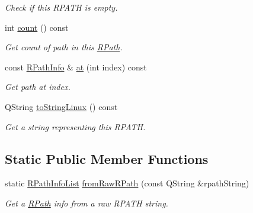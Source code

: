 \begin{DoxyCompactItemize}
\begin{DoxyCompactList}\small\item\em Check if this R\+P\+A\+TH is empty. \end{DoxyCompactList}\item 
int \hyperlink{class_mdt_1_1_deploy_utils_1_1_r_path_info_list_af844846f9b835d26c60d1e9f8f71a2d4}{count} () const \hypertarget{class_mdt_1_1_deploy_utils_1_1_r_path_info_list_af844846f9b835d26c60d1e9f8f71a2d4}{}\label{class_mdt_1_1_deploy_utils_1_1_r_path_info_list_af844846f9b835d26c60d1e9f8f71a2d4}

\begin{DoxyCompactList}\small\item\em Get count of path in this \hyperlink{class_mdt_1_1_deploy_utils_1_1_r_path}{R\+Path}. \end{DoxyCompactList}\item 
const \hyperlink{class_mdt_1_1_deploy_utils_1_1_r_path_info}{R\+Path\+Info} \& \hyperlink{class_mdt_1_1_deploy_utils_1_1_r_path_info_list_a5070c90e807768597a8458f7ca151810}{at} (int index) const 
\begin{DoxyCompactList}\small\item\em Get path at {\itshape index}. \end{DoxyCompactList}\item 
Q\+String \hyperlink{class_mdt_1_1_deploy_utils_1_1_r_path_info_list_a5683c4968af1b378ab337110f8316242}{to\+String\+Linux} () const 
\begin{DoxyCompactList}\small\item\em Get a string representing this R\+P\+A\+TH. \end{DoxyCompactList}\end{DoxyCompactItemize}
\subsection*{Static Public Member Functions}
\begin{DoxyCompactItemize}
\item 
static \hyperlink{class_mdt_1_1_deploy_utils_1_1_r_path_info_list}{R\+Path\+Info\+List} \hyperlink{class_mdt_1_1_deploy_utils_1_1_r_path_info_list_ac3cd8b396c9682f320f4e52561798591}{from\+Raw\+R\+Path} (const Q\+String \&rpath\+String)\hypertarget{class_mdt_1_1_deploy_utils_1_1_r_path_info_list_ac3cd8b396c9682f320f4e52561798591}{}\label{class_mdt_1_1_deploy_utils_1_1_r_path_info_list_ac3cd8b396c9682f320f4e52561798591}

\begin{DoxyCompactList}\small\item\em Get a \hyperlink{class_mdt_1_1_deploy_utils_1_1_r_path}{R\+Path} info from a raw R\+P\+A\+TH string. \end{DoxyCompactList}\end{DoxyCompactItemize}


